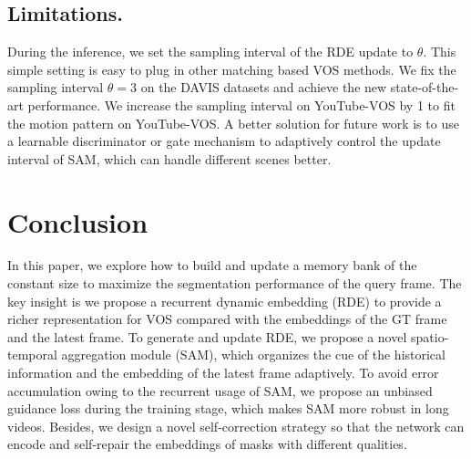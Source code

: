 \documentclass[10pt,twocolumn,letterpaper]{article}
\begin{document}
\begin{table}[t]
	\centering
	\vspace{-0.5em}
	\caption{Ablation of different loss functions without the BL30K \cite{cheng2021modular} pre-training.}
	\label{tab:ablation-loss}
	\vspace{-1em}
\end{table}


\subsection{Limitations.}
During the inference, we set the sampling interval of the RDE update to $\theta$. This simple setting is easy to plug in other matching based VOS methods. We fix the sampling interval $\theta=3$ on the DAVIS datasets and achieve the new state-of-the-art performance. We increase the sampling interval on YouTube-VOS by 1 to fit the motion pattern on YouTube-VOS. 
A better solution for future work is to use a learnable discriminator \cite{goodfellow2020generative} or gate mechanism \cite{yu2019free} to adaptively control the update interval of SAM, which can handle different scenes better.












\section{Conclusion}
In this paper, we explore how to build and update a memory bank of the constant size to maximize the segmentation performance of the query frame. The key insight is we propose a recurrent dynamic embedding (RDE) to provide a richer representation for VOS compared with the embeddings of the GT frame and the latest frame. To generate and update RDE, we propose a novel spatio-temporal aggregation module (SAM), which organizes the cue of the historical information and the embedding of the latest frame adaptively. To avoid error accumulation owing to the recurrent usage of SAM, we propose an unbiased guidance loss during the training stage, which makes SAM more robust in long videos. Besides, we design a novel self-correction strategy so that the network can encode and self-repair the embeddings of masks with different qualities. 
\end{document}
